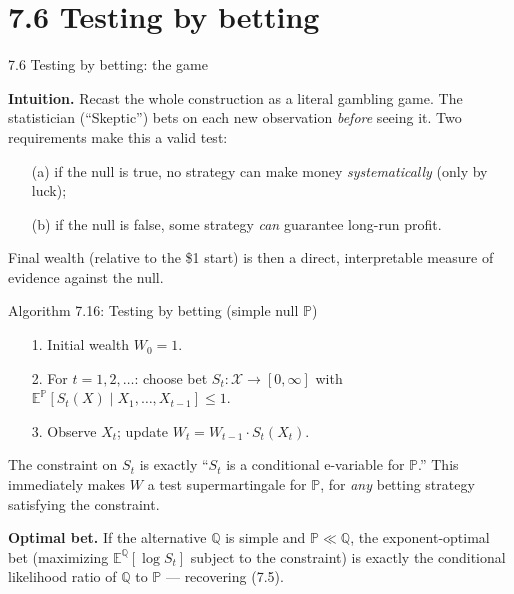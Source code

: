\documentclass[aspectratio=169,10pt]{beamer}
\begin{document}
\section{7.6 Testing by betting}

\begin{frame}{7.6 Testing by betting: the game}

\textbf{Intuition.} Recast the whole construction as a literal gambling game. The statistician (``Skeptic'') bets
on each new observation \emph{before} seeing it. Two requirements make this a valid test:
\begin{itemize}
\item[(a)] if the null is true, no strategy can make money \emph{systematically} (only by luck);
\item[(b)] if the null is false, some strategy \emph{can} guarantee long-run profit.
\end{itemize}
Final wealth (relative to the \$1 start) is then a direct, interpretable measure of evidence against the null.

\begin{block}{Algorithm 7.16: Testing by betting (simple null $\mathbb P$)}
\begin{enumerate}
\item[1.] Initial wealth $W_0 = 1$.
\item[2.] For $t=1,2,\dots$: choose bet $S_t : \mathcal X \to [0,\infty]$ with $\mathbb E^{\mathbb P}[S_t(X)\mid X_1,\dots,X_{t-1}] \le 1$.
\item[3.] Observe $X_t$; update $W_t = W_{t-1}\cdot S_t(X_t)$.
\end{enumerate}
\end{block}

The constraint on $S_t$ is exactly ``$S_t$ is a conditional e-variable for $\mathbb P$.'' This immediately makes
$W$ a test supermartingale for $\mathbb P$, for \emph{any} betting strategy satisfying the constraint.

\textbf{Optimal bet.} If the alternative $\mathbb Q$ is simple and $\mathbb P \ll \mathbb Q$, the exponent-optimal
bet (maximizing $\mathbb E^{\mathbb Q}[\log S_t]$ subject to the constraint) is exactly the conditional likelihood
ratio of $\mathbb Q$ to $\mathbb P$ --- recovering (7.5).

\end{frame}
\end{document}
